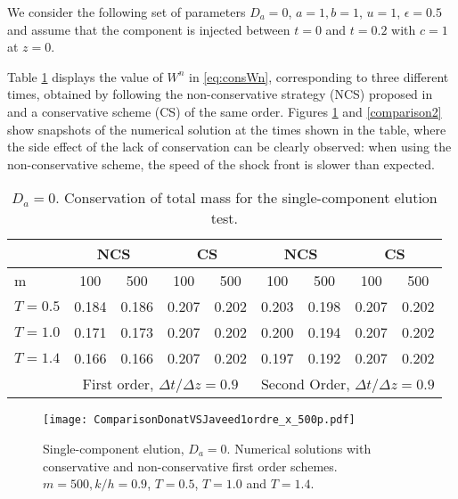 \documentclass[preprint]{elsarticle}
\theoremstyle{definition}
\begin{document}
We consider the following set of parameters $D_a=0$, $a=1, b=1$, $u=1$,
$\epsilon=0.5$ and assume that the component is injected between
$t=0$ and $t=0.2$ with $c=1$ at $z=0$. 

Table \ref{tablacons} displays the
value of $W^n$ in \eqref{eq:consWn}, corresponding to three different 
times, obtained by following the non-conservative strategy (NCS) proposed in
\cite{Javeed} and a conservative scheme (CS) of the same order.
Figures \ref{comparison1} and \ref{comparison2} show snapshots of the numerical solution at the times
shown in the table, where the side  effect of the lack of conservation
can be clearly observed: when using  the non-conservative scheme,
the speed of the shock front is  slower than 
expected. 
\begin{table}[htbp]
\begin{center}
\begin{tabular}{|l|c|c|c|c||c|c|c|c|}
\hline
  & \multicolumn{2}{c|}{NCS} & \multicolumn{2}{c||}{CS}
& \multicolumn{2}{c|}{NCS} & \multicolumn{2}{c|}{CS} \\
\hline
 m & 100& 500 & 100 & 500 & 100& 500 & 100 & 500\\ \hline \hline
$T=0.5$ & 0.184 & 0.186 & 0.207  & 0.202  & 0.203 & 0.198 & 0.207 & 0.202  \\ \hline
$T=1.0$ & 0.171 & 0.173 & 0.207 & 0.202  & 0.200 & 0.194 & 0.207 & 0.202 \\ \hline
$T=1.4$ & 0.166 & 0.166 & 0.207 & 0.202  & 0.197 & 0.192 & 0.207
&0.202 
\\ \hline \hline
  & \multicolumn{4}{c|}{First order, $\Delta t/\Delta z=0.9$} & \multicolumn{4}{c|}{Second
    Order, $\Delta t/\Delta z=0.9$} \\ \hline
\end{tabular}
\caption{$D_a=0$. Conservation of  total mass for the single-component elution
  test.}
\label{tablacons}
\end{center}
\end{table}





\begin{figure}[ht]   
\begin{center} 
\texttt{[image: ComparisonDonatVSJaveed1ordre\_x\_500p.pdf]}
\end{center}   
\caption{Single-component elution, $D_a=0$. Numerical solutions with conservative and non-conservative
  first order schemes. $m=500, k/h=0.9$, $T=0.5$, $T=1.0$ and $T=1.4$. }  
\label{comparison1}  
\end{figure}
\end{document}
